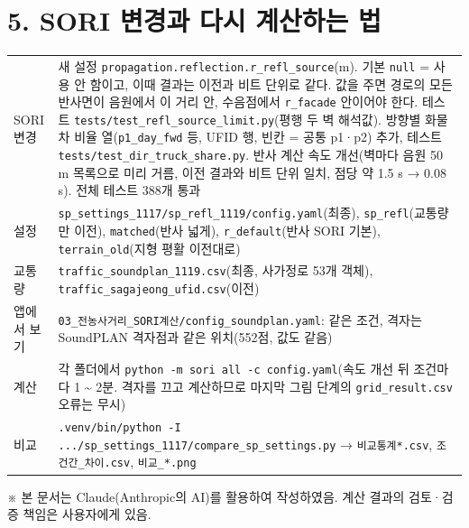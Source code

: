\documentclass[10pt,a4paper]{article}
\newcommand{\f}[1]{\texttt{#1}}
\begin{document}
\section*{5. SORI 변경과 다시 계산하는 법}
\begin{tabularx}{\linewidth}{@{}p{30mm}L@{}}
\toprule
SORI 변경 & 새 설정 \f{propagation.reflection.r\_refl\_source}(m). 기본 \f{null} = 사용 안 함이고, 이때 결과는 이전과 비트 단위로 같다.
값을 주면 경로의 모든 반사면이 음원에서 이 거리 안, 수음점에서 \f{r\_facade} 안이어야 한다. 테스트 \f{tests/test\_refl\_source\_limit.py}(평행 두 벽 해석값). 방향별 화물차 비율 열(\f{p1\_day\_fwd} 등, UFID 행, 빈칸 = 공통 p1·p2) 추가, 테스트 \f{tests/test\_dir\_truck\_share.py}. 반사 계산 속도 개선(벽마다 음원 50 m 목록으로 미리 거름, 이전 결과와 비트 단위 일치, 점당 약 1.5 s → 0.08 s). 전체 테스트 388개 통과 \\
설정 & \f{sp\_settings\_1117/sp\_refl\_1119/config.yaml}(최종), \f{sp\_refl}(교통량만 이전), \f{matched}(반사 넓게), \f{r\_default}(반사 SORI 기본), \f{terrain\_old}(지형 평활 이전대로) \\
교통량 & \f{traffic\_soundplan\_1119.csv}(최종, 사가정로 53개 객체), \f{traffic\_sagajeong\_ufid.csv}(이전) \\
앱에서 보기 & \f{03\_전농사거리\_SORI계산/config\_soundplan.yaml}: 같은 조건, 격자는 SoundPLAN 격자점과 같은 위치(552점, 값도 같음) \\
계산 & 각 폴더에서 \f{python -m sori all -c config.yaml}(속도 개선 뒤 조건마다 1 \textasciitilde{} 2분. 격자를 끄고 계산하므로 마지막 그림 단계의 \f{grid\_result.csv} 오류는 무시) \\
비교 & \f{.venv/bin/python -I .../sp\_settings\_1117/compare\_sp\_settings.py} → \f{비교통계*.csv}, \f{조건간\_차이.csv}, \f{비교\_*.png} \\
\bottomrule
\end{tabularx}

\vfill
{\footnotesize\color{gray} ※ 본 문서는 Claude(Anthropic의 AI)를 활용하여 작성하였음. 계산 결과의 검토·검증 책임은 사용자에게 있음.}
\end{document}
